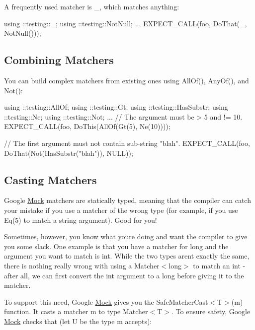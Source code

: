 A frequently used matcher is {\ttfamily \+\_\+}, which matches anything\+:


\begin{DoxyCode}
using ::testing::\_;
using ::testing::NotNull;
...
  EXPECT\_CALL(foo, DoThat(\_, NotNull()));
\end{DoxyCode}


\subsection*{Combining Matchers}

You can build complex matchers from existing ones using {\ttfamily All\+Of()}, {\ttfamily Any\+Of()}, and {\ttfamily Not()}\+:


\begin{DoxyCode}
using ::testing::AllOf;
using ::testing::Gt;
using ::testing::HasSubstr;
using ::testing::Ne;
using ::testing::Not;
...
  \textcolor{comment}{// The argument must be > 5 and != 10.}
  EXPECT\_CALL(foo, DoThis(AllOf(Gt(5),
                                Ne(10))));

  \textcolor{comment}{// The first argument must not contain sub-string "blah".}
  EXPECT\_CALL(foo, DoThat(Not(HasSubstr(\textcolor{stringliteral}{"blah"})),
                          NULL));
\end{DoxyCode}


\subsection*{Casting Matchers}

Google \hyperlink{classMock}{Mock} matchers are statically typed, meaning that the compiler can catch your mistake if you use a matcher of the wrong type (for example, if you use {\ttfamily Eq(5)} to match a {\ttfamily string} argument). Good for you!

Sometimes, however, you know what you\textquotesingle{}re doing and want the compiler to give you some slack. One example is that you have a matcher for {\ttfamily long} and the argument you want to match is {\ttfamily int}. While the two types aren\textquotesingle{}t exactly the same, there is nothing really wrong with using a {\ttfamily Matcher$<$long$>$} to match an {\ttfamily int} -\/ after all, we can first convert the {\ttfamily int} argument to a {\ttfamily long} before giving it to the matcher.

To support this need, Google \hyperlink{classMock}{Mock} gives you the {\ttfamily Safe\+Matcher\+Cast$<$T$>$(m)} function. It casts a matcher {\ttfamily m} to type {\ttfamily Matcher$<$T$>$}. To ensure safety, Google \hyperlink{classMock}{Mock} checks that (let {\ttfamily U} be the type {\ttfamily m} accepts)\+:


